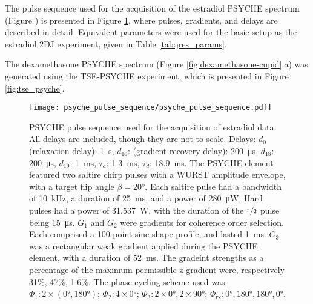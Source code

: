 The pulse sequence used for the acquisition of the estradiol \ac{PSYCHE}
spectrum (Figure ) is presented in Figure \ref{fig:psyche}, where
pulses, gradients, and delays are described in detail. Equivalent parameters
were used for the basic setup as the estradiol 2DJ experiment, given in Table
\ref{tab:jres_params}.

The dexamethasone \ac{PSYCHE} spectrum (Figure \ref{fig:dexamethasone-cupid}.a)
was generated using the \ac{TSE-PSYCHE} experiment, which is presented in
Figure \ref{fig:tse_psyche}.



\begin{figure}
    \centering
    \texttt{[image: psyche\_pulse\_sequence/psyche\_pulse\_sequence.pdf]}
    \caption[
        \acs{PSYCHE} pulse sequence used for the acquisition of estradiol data.
    ]{
        \acs{PSYCHE} pulse sequence used for the acquisition of estradiol data. All
        delays are included, though they are not to scale.
        Delays:
        $d_0$ (relaxation delay): \qty{1}{\second},
        $d_{16}$: (gradient recovery delay): \qty{200}{\micro\second},
        $d_{18}$: \qty{200}{\micro\second},
        $d_{19}$: \qty{1}{\milli\second},
        $\tau_a$: \qty{1.3}{\milli\second},
        $\tau_d$: \qty{18.9}{\milli\second}.
        The \ac{PSYCHE} element featured two saltire chirp pulses with a
        \ac{WURST}\cite{ODell2013}
        amplitude envelope, with a target flip angle $\beta = \ang{20}$.
        Each saltire pulse
        had a bandwidth of \qty{10}{\kilo\hertz},
        a duration of \qty{25}{\milli\second},
        and a power of \qty{280}{\micro\watt}.
        Hard pulses
        had a power of \qty{31.537}{\watt},
        with the duration of the $\nicefrac{\pi}{2}$ pulse being \qty{15}{\micro\second}.
        $G_1$ and $G_2$ were gradients for coherence order selection.
        Each comprised a 100-point sine shape profile, and lasted
        \qty{1}{\milli\second}.
        $G_3$ was a rectangular weak gradient applied during the PSYCHE
        element, with a duration of \qty{52}{\milli\second}.
        The gradeint strengths as a percentage of the maximum permissible
        z-gradient were, respectively 31\%, 47\%, 1.6\%.
        The phase cycling scheme used was:
        $\Phi_1: 2 \times (\ang{0}, \ang{180})$;
        $\Phi_2: 4 \times \ang{0}$;
        $\Phi_3: 2 \times \ang{0}, 2 \times \ang{90}$;
        $\Phi_{\text{rx}}: \ang{0}, \ang{180}, \ang{180}, \ang{0}$.
    }
    \label{fig:psyche}
\end{figure}


